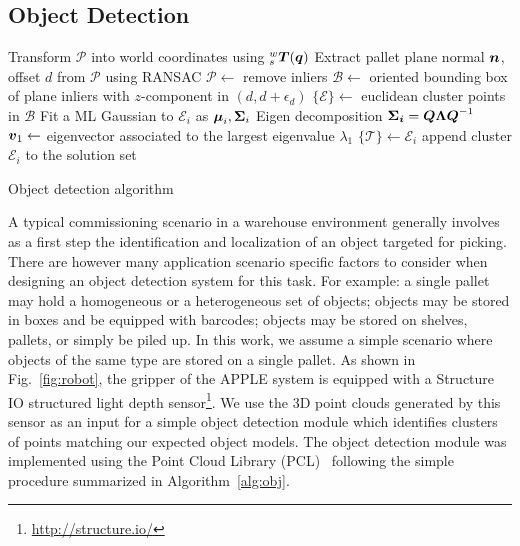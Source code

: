 \subsection{Object Detection}
\label{subsec:obj_det}
%
%
\begin{algorithm}[t!]
{}
Transform $\mathcal{P}$ into world coordinates using $^w_s\mbox{\boldmath $T$}(\mbox{\boldmath $q$})$\;
 {
    Extract pallet plane normal $\mbox{\boldmath $n$}$, offset $d$ from $\mathcal{P}$ using RANSAC\;
     {$\mathcal{P} \leftarrow$ remove inliers\; }
}
$\mathcal{B} \leftarrow$ oriented bounding box of plane inliers with $z$-component in $(d,d+\epsilon_d)$\;
$\{\mathcal{E}\} \leftarrow$ euclidean cluster points in $\mathcal{B}$\;
 {
    Fit a ML Gaussian to $\mathcal{E}_i$ as $\mbox{\boldmath $\mu$}_i,\mbox{\boldmath $\Sigma$}_i$\;
    Eigen decomposition $\mbox{\boldmath $\Sigma_i$}=\mbox{\boldmath $Q$}\mbox{\boldmath $\Lambda$}\mbox{\boldmath $Q$}^{-1}$\;
    $\mbox{\boldmath $v$}_1 \leftarrow$ eigenvector associated to the largest eigenvalue $\lambda_1$\;
     { $\{\mathcal{T}\}
      \leftarrow \mathcal{E}_i$ append cluster $\mathcal{E}_i$ to the solution set\;}
}
\caption{Object detection algorithm}\label{alg:obj}
\end{algorithm}
%
A typical commissioning scenario in a warehouse environment generally involves as a first step the
identification and localization of an object targeted for picking. There are however many
application scenario specific factors to consider when designing an object detection system for this
task. For example: a single pallet may hold a homogeneous or a heterogeneous set of objects; objects
may be stored in boxes and be equipped with barcodes; objects may be stored on shelves, pallets, or
simply be piled up. In this work, we assume a simple scenario where objects of the same type are
stored on a single pallet. As shown in Fig.~\ref{fig:robot}, the gripper of the APPLE system is
equipped with a Structure IO structured light depth sensor\footnote{\url{http://structure.io/}}. We
use the 3D point clouds generated by this sensor as an input for a simple object detection module
which identifies clusters of points matching our expected object models. The object detection module
was implemented using the Point Cloud Library (PCL)~\cite{Rusu11} following the simple procedure
summarized in Algorithm~\ref{alg:obj}.

